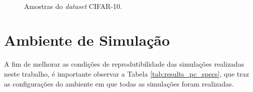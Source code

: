 \begin{figure}[H]
    \centering
    \hspace{0.1cm}
    \hspace{0.1cm}
    \hspace{0.1cm}
    \hspace{0.1cm}
    \hspace{0.1cm}
    \\
    \hspace{0.1cm}
    \hspace{0.1cm}
    \hspace{0.1cm}
    \hspace{0.1cm}
    \hspace{0.1cm}
    \caption{Amostras do \textit{dataset} CIFAR-10.}
    \label{fig:datasets_cifar}
\end{figure}


\section{Ambiente de Simulação}
\label{sec:results_simulation_environment}

A fim de melhorar as condições de reprodutibilidade das simulações realizadas neste trabalho, é importante observar a Tabela \ref{tab:results_pc_specs}, que traz as configurações do ambiente em que todas as simulações foram realizadas.



